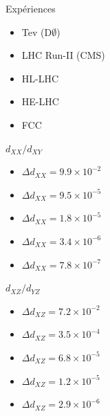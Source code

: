 \documentclass[a4paper,11pt,twoside,french]{article}
\begin{document}
                        \begin{multicols}{3}
                            Expériences
            				\begin{itemize}[label=$\triangleright$]
                				\item Tev (D$\emptyset$)
                				\item LHC Run-II (CMS)
                				\item HL-LHC 
                				\item HE-LHC 
                				\item FCC 
            				\end{itemize}
                            $d_{XX} / d_{XY}  $
                			\begin{itemize}[label=$\triangleright$]
                				\item $\Delta d_{XX} = 9.9\times 10^{-2}$
                				\item $\Delta d_{XX} = 9.5\times 10^{-5}$
                				\item $\Delta d_{XX} = 1.8\times 10^{-5}$
                				\item $\Delta d_{XX} = 3.4\times 10^{-6}$
                				\item $\Delta d_{XX} = 7.8\times 10^{-7}$
                			\end{itemize}
                            $d_{XZ}  / d_{YZ} $
                			\begin{itemize}[label=$\triangleright$]
                				\item $\Delta d_{XZ} = 7.2\times 10^{-2}$		
                				\item $\Delta d_{XZ} = 3.5\times 10^{-4}$		
                				\item $\Delta d_{XZ} = 6.8\times 10^{-5}$		
                				\item $\Delta d_{XZ} = 1.2\times 10^{-5}$		
                				\item $\Delta d_{XZ} = 2.9\times 10^{-6}$		
                			\end{itemize}
                        \end{multicols}
\end{document}
